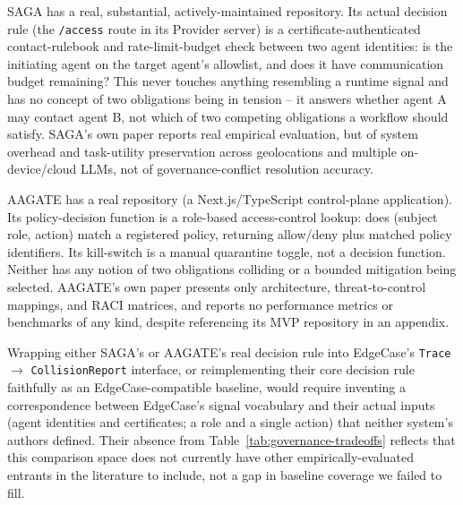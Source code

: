 \documentclass[letterpaper]{article} %
\begin{document}
SAGA has a real, substantial, actively-maintained repository. Its actual decision rule (the \texttt{/access} route in its Provider server) is a certificate-authenticated contact-rulebook and rate-limit-budget check between two agent identities: is the initiating agent on the target agent's allowlist, and does it have communication budget remaining? This never touches anything resembling a runtime signal and has no concept of two obligations being in tension -- it answers whether agent A may contact agent B, not which of two competing obligations a workflow should satisfy. SAGA's own paper reports real empirical evaluation, but of system overhead and task-utility preservation across geolocations and multiple on-device/cloud LLMs, not of governance-conflict resolution accuracy.

AAGATE has a real repository (a Next.js/TypeScript control-plane application). Its policy-decision function is a role-based access-control lookup: does (subject role, action) match a registered policy, returning allow/deny plus matched policy identifiers. Its kill-switch is a manual quarantine toggle, not a decision function. Neither has any notion of two obligations colliding or a bounded mitigation being selected. AAGATE's own paper presents only architecture, threat-to-control mappings, and RACI matrices, and reports no performance metrics or benchmarks of any kind, despite referencing its MVP repository in an appendix.

Wrapping either SAGA's or AAGATE's real decision rule into EdgeCase's \texttt{Trace} $\rightarrow$ \texttt{CollisionReport} interface, or reimplementing their core decision rule faithfully as an EdgeCase-compatible baseline, would require inventing a correspondence between EdgeCase's signal vocabulary and their actual inputs (agent identities and certificates; a role and a single action) that neither system's authors defined. Their absence from Table~\ref{tab:governance-tradeoffs} reflects that this comparison space does not currently have other empirically-evaluated entrants in the literature to include, not a gap in baseline coverage we failed to fill.
\end{document}
